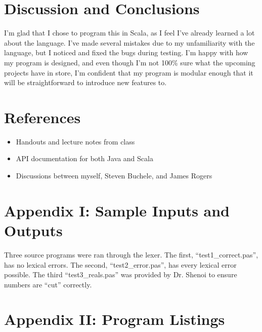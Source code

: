 \documentclass[paper=letter, fontsize=11pt, oneside, titlepage]{scrartcl}
\newcommand{\filelisting}[2][]{
    
}
\begin{document}
\section{Discussion and Conclusions}\label{conclusions}

I'm glad that I chose to program this in Scala, as I feel I've already learned a lot about the language.  I've made several mistakes due to my unfamiliarity with the language, but I noticed and fixed the bugs during testing.  I'm happy with how my program is designed, and even though I'm not 100\% sure what the upcoming projects have in store, I'm confident that my program is modular enough that it will be straightforward to introduce new features to.

\section{References}\label{ref}

\begin{itemize}
    \item Handouts and lecture notes from class
    \item API documentation for both Java and Scala
    \item Discussions between myself, Steven Buchele, and James Rogers
\end{itemize}

\section{Appendix I: Sample Inputs and Outputs}\label{sample}

Three source programs were ran through the lexer. The first, ``test1\_correct.pas'', has no lexical errors.  The second, ``test2\_error.pas'', has every lexical error possible.  The third ``test3\_reals.pas'' was provided by Dr. Shenoi to ensure numbers are ``cut'' correctly.

\filelisting[language=pascal]{test1_correct.pas}
\filelisting{test1_correct.pas.listing}
\filelisting{test1_correct.pas.tokens}
\filelisting[language=pascal]{test2_errors.pas}
\filelisting{test2_errors.pas.listing}
\filelisting{test2_errors.pas.tokens}
\filelisting[language=pascal]{test3_reals.pas}
\filelisting{test3_reals.pas.listing}
\filelisting{test3_reals.pas.tokens}

\section{Appendix II: Program Listings}\label{code}
\end{document}
